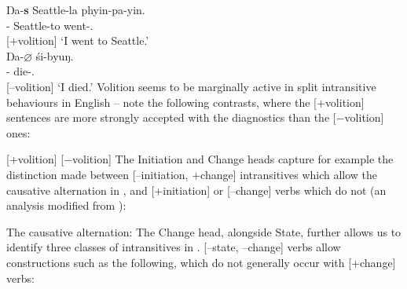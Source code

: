 \documentclass[output=paper]{langsci/langscibook}
\begin{document}
\newpage
\ea {} \parencite[132]{DeLancey1984}
    \ea
        \gll Ŋa-\textbf{s} Seattle-la phyin-pa-yin.\\
        \Fsg-\Erg{}  Seattle-to  went-\Prf.\Vol\\ \hfill [$+$volition]
        \glt \enquote*{I went to Seattle.}\\
    \ex
        \gll Ŋa-\textbf{$\varnothing$} śi-byuŋ.\\
        \Fsg-\Abs{}    die-\Prf.\Invol\\ \hfill[$–$volition]
        \glt \enquote*{I died.}
    \z
\z
Volition seems to be marginally active in split intransitive behaviours in
English -- note the following contrasts, where the [$+$volition] sentences are
more strongly accepted with the diagnostics than the [$-$volition] ones:

\ea
    \z
\z

\ea
    \ea {}[$+$volition]
        \z
    \ex {}[$-$volition]
        \z
    \z
\z
The Initiation and Change heads capture for example the distinction made
between [$–$initiation, $+$change] intransitives which allow the causative
alternation in , and [$+$initiation] or [$–$change] verbs which do not
(an analysis modified from \citealt{Ramchand2008}):

\ea The causative alternation:
    \ea
        \z
    \ex
        \z
    \ex
        \z
    \ex
        \z
    \z
\z
The Change head, alongside State, further allows us to identify three classes
of intransitives in . [$–$state, $–$change] verbs allow constructions
such as the following, which do not generally occur with [$+$change] verbs:
\end{document}
